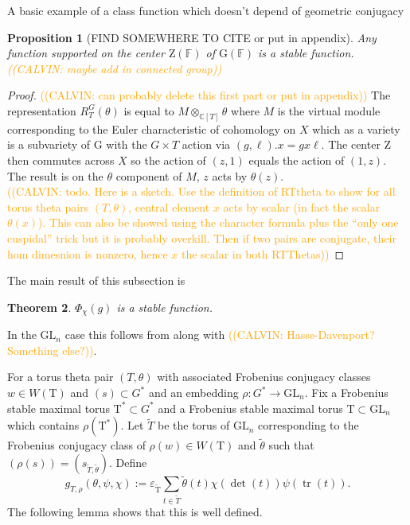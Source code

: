 \documentclass[12pt, reqno]{amsart}
\newtheorem{theorem}{Theorem}[section]
\newtheorem{proposition}[theorem]{Proposition}
\theoremstyle{definition}
\theoremstyle{definition}
\theoremstyle{definition}
\newcommand{\trace}{\operatorname{tr}}
\newcommand{\GL}{\mathrm{GL}}
\newcommand{\finiteField}{\mathbb{F}}
\newcommand{\dblVirtualGaussSumScalar}[2]{\mathrm{g}^{\mathrm{dbl}}\left(#1, #2\right)}
\newcommand{\algebraicGroup}[1]{\boldsymbol{\mathrm{#1}}}
\newcommand{\calvin}[1]{\textcolor{orange}{\sffamily ((CALVIN: #1))}}
\begin{document}
A basic example of a class function which doesn't depend of geometric conjugacy 
\begin{proposition}[FIND SOMEWHERE TO CITE or put in appendix]
\label{prop:central_char}
    Any function supported on the center $\algebraicGroup{Z}(\mathbb{F})$ of $\algebraicGroup{G}(\finiteField)$ is a stable function. \calvin{maybe add in connected group} 
\end{proposition}
\begin{proof}
\calvin{can probably delete this first part or put in appendix}
The representation $R_T^G(\theta)$ is equal to $M \otimes_{\mathbb{C}[T]} \theta$ where $M$ is the virtual module corresponding to the Euler characteristic of cohomology on $X$ which as a variety is a subvariety of $\algebraicGroup{G}$ with the $G \times T$ action via $(g,\ell).x = gx\ell$. The center $\algebraicGroup{Z}$ then commutes across $X$ so the action of $(z,1)$ equals the action of $(1,z)$. The result is on the $\theta$ component of $M$, $z$ acts by $\theta(z)$.\\

\calvin{todo. Here is a sketch. Use the definition of RTtheta to show for all torus theta pairs $(T,\theta)$, central element $x$ acts by scalar (in fact the scalar $\theta(x)$). This can also be showed using the character formula plus the ``only one cuspidal'' trick but it is probably overkill. Then if two pairs are conjugate, their hom dimesnion is nonzero, hence $x$ the scalar in both RTThetas} 
\end{proof}


The main result of this subsection is 
\begin{theorem}
\label{thm:indep_geo_conj}
	$\Phi_{\chi}(g)$ is a stable function.
\end{theorem}

In the $\GL_n$ case this follows from  along with \calvin{Hasse-Davenport? Something else?}.


For a torus theta pair $(T,\theta)$ with associated Frobenius conjugacy classes $w \in W(\algebraicGroup{T})$ and $(s) \subset G^*$ and an embedding $\rho:G^* \to \GL_n$.  Fix a Frobenius stable maximal torus $\algebraicGroup{T}^* \subset G^*$ and a Frobenius stable maximal torus $\algebraicGroup{T} \subset \GL_n$ which contains $\rho(\algebraicGroup{T}^*)$. Let $\tilde{T}$ be the torus of $\GL_n$ corresponding to the Frobenius conjugacy class of $\rho(w) \in W(\algebraicGroup{T})$ and $\tilde{\theta}$ such that $(\rho(s)) = (s_{\tilde{T},\tilde{\theta}})$. Define
\[
    g_{T,\rho}(\theta,\psi,\chi) := \varepsilon_{\algebraicGroup{
    \tilde{T}}}\sum_{t\in \tilde{T}} \tilde{\theta}(t)\chi(\det(t))\psi(\trace(t)).
\]
The following lemma shows that this is well defined.
\end{document}
